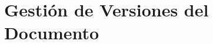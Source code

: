 \documentclass[
    language=spanish,
    school=esdf,
    docstage=final,
    media=paper,
    bookprint=false,
    linkcolor=red!45!black,
    chapterstyle=classic,
    coverstyle=classic,
    aiacknowledgement=true,
    listprefix=false
]{IPLeiriaThesis}
\begin{document}
\part{Gestión de Versiones del Documento}




\renewcommand{\refname}{Bibliography}
\printbibliography[title={\refname},heading=bibintoc]

\appendix
\setcounter{chapter}{0} %
\renewcommand{\thechapter}{\Alph{chapter}} %











\end{document}
